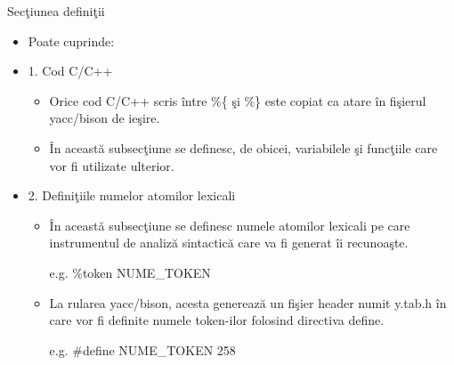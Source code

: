 \documentclass[pdf]{beamer}
\begin{document}
\begin{frame}{Secţiunea definiţii}
\begin{itemize}
	\item
	Poate cuprinde:
	
	\item
	1. Cod C/C++

	\begin{itemize}
		\item<cir@1->
		Orice cod C/C++ scris între \%\{ şi \%\} este copiat ca atare în fişierul yacc/bison de ieşire.

		\item<cir@1->
		În această subsecţiune se definesc, de obicei, variabilele şi funcţiile care vor fi utilizate ulterior.
	\end{itemize}

	\item
	2. Definiţiile numelor atomilor lexicali

	\begin{itemize}
		\item<cir@1->
		În această subsecţiune se definesc numele atomilor lexicali pe care instrumentul de analiză sintactică care va fi generat îi recunoaşte.

		e.g. \%token NUME\_TOKEN

		\item<cir@1->
		La rularea yacc/bison, acesta generează un fişier header numit y.tab.h în care vor fi definite numele token-ilor folosind directiva define.

		e.g. \#define NUME\_TOKEN 258
	\end{itemize}

\end{itemize}
\end{frame}
\end{document}
